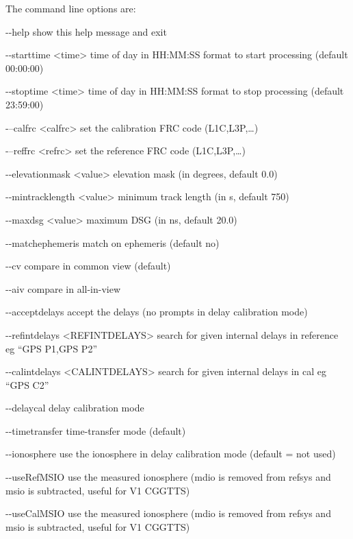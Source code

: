 The command line options are:
\begin{description*}
	\item[-{}-help]            show this help message and exit
	\item[-{}-starttime \textless{time}\textgreater ] time of day in HH:MM:SS format
	to start processing (default 00:00:00)
	\item[-{}-stoptime \textless{time}\textgreater]  time of day in HH:MM:SS format
	to stop processing (default 23:59:00)
	\item[-{}--calfrc \textless{calfrc}\textgreater]       set the calibration FRC code (L1C,L3P,\ldots)
	\item[-{}--reffrc \textless{refrc}\textgreater]      set the reference FRC code (L1C,L3P,\ldots)
	\item[-{}-elevationmask \textless{value}\textgreater] elevation mask (in degrees, default 0.0)
	\item[-{}-mintracklength \textless{value}\textgreater] minimum track length (in s, default 750)
	\item[-{}-maxdsg \textless{value}\textgreater]       maximum DSG (in ns, default 20.0)
	\item[-{}-matchephemeris ]     match on ephemeris (default no)
	\item[-{}-cv]                  compare in common view (default)
	\item[-{}-aiv]                 compare in all-in-view
	\item[-{}-acceptdelays]        accept the delays (no prompts in delay calibration mode)
	\item[-{}-refintdelays \textless{REFINTDELAYS}\textgreater] search for given internal delays in reference eg ``GPS P1,GPS P2''
  \item[-{}-calintdelays \textless{CALINTDELAYS}\textgreater] search for given internal delays in cal eg ``GPS C2''
	\item[-{}-delaycal]            delay calibration mode
	\item[-{}-timetransfer]        time-transfer mode (default)
	\item[-{}-ionosphere]          use the ionosphere in delay calibration mode (default = not used)
	\item[-{}-useRefMSIO]          use the measured ionosphere (mdio is removed from refsys and msio is subtracted, useful for V1 CGGTTS)
  \item[-{}-useCalMSIO]          use the measured ionosphere (mdio is removed from refsys and msio is subtracted, useful for V1 CGGTTS)

\end{description*}
